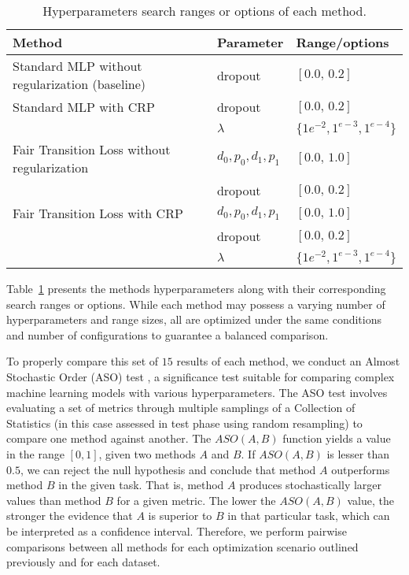 \begin{table}[ht]
\centering
\caption{Hyperparameters search ranges or options of each method.}\label{tab:hyperparameters_crp}
{\footnotesize
\begin{tabular}{lll}
\toprule
Method & Parameter & Range/options \\ \midrule
 Standard MLP without regularization (baseline) & dropout & $[0.0,\,0.2]$  \vspace{1ex} \\
 Standard MLP with CRP & dropout & $[0.0,\,0.2]$  \vspace{1ex} \\
 & $\lambda$ & $\{1e^{-2}, 1^{e-3}, 1^{e-4}\}$ \\
 Fair Transition Loss without regularization & $d_0,p_0,d_1,p_1$ & $[0.0,\,1.0]$ \\
 &  dropout & $[0.0,\,0.2]$ \\
 Fair Transition Loss with CRP & $d_0,p_0,d_1,p_1$ & $[0.0,\,1.0]$ \\
 &  dropout & $[0.0,\,0.2]$ \\
 & $\lambda$ & $\{1e^{-2}, 1^{e-3}, 1^{e-4}\}$ \\
\bottomrule
\end{tabular}
}
\end{table}

Table~\ref{tab:hyperparameters_crp} presents the methods hyperparameters along with their corresponding search ranges or options. While each method may possess a varying number of hyperparameters and range sizes, all are optimized under the same conditions and number of configurations to guarantee a balanced comparison.

To properly compare this set of $15$ results of each method, we conduct an Almost Stochastic Order (ASO) test \citep{dror2019deep}, a significance test suitable for comparing complex machine learning models with various hyperparameters. The ASO test involves evaluating a set of metrics through multiple samplings of a Collection of Statistics (in this case assessed in test phase using random resampling) to compare one method against another. The $ASO(A, B)$ function yields a value in the range $[0, 1]$, given two methods $A$ and $B$. If $ASO(A, B)$ is lesser than $0.5$, we can reject the null hypothesis and conclude that method $A$ outperforms method $B$ in the given task. That is, method $A$ produces stochastically larger values than method $B$ for a given metric. The lower the $ASO(A, B)$ value, the stronger the evidence that $A$ is superior to $B$ in that particular task, which can be interpreted as a confidence interval. Therefore, we perform pairwise comparisons between all methods for each optimization scenario outlined previously and for each dataset.

